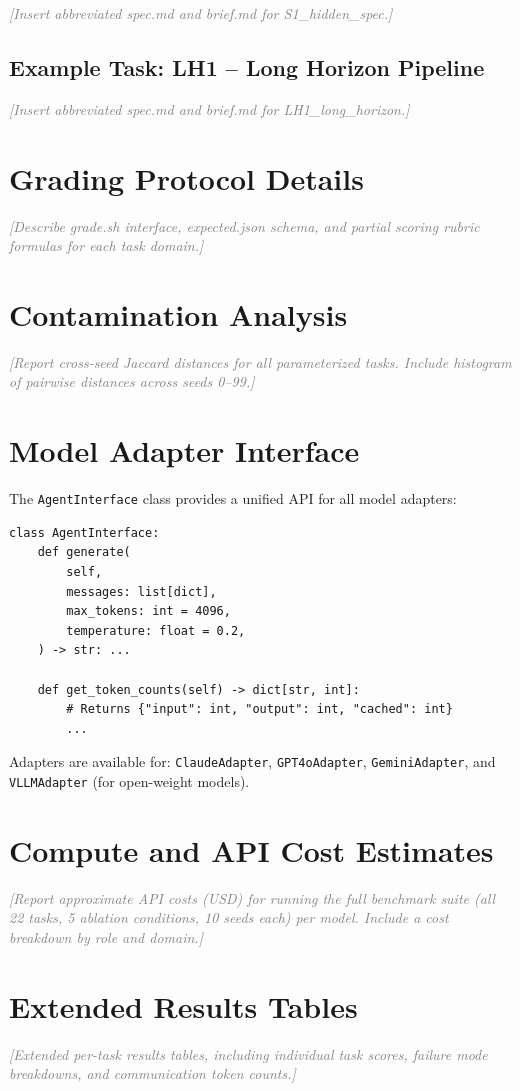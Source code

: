 \documentclass{article}
\newcommand{\placeholder}[1]{\textcolor{gray}{\textit{[#1]}}}
\newcommand{\sys}[1]{\texttt{#1}}
\begin{document}
\placeholder{Insert abbreviated spec.md and brief.md for S1\_hidden\_spec.}

\subsection{Example Task: LH1 -- Long Horizon Pipeline}
\label{app:tasks:lh1}

\placeholder{Insert abbreviated spec.md and brief.md for LH1\_long\_horizon.}

\section{Grading Protocol Details}
\label{app:grading}

\placeholder{Describe grade.sh interface, expected.json schema, and
partial scoring rubric formulas for each task domain.}

\section{Contamination Analysis}
\label{app:contamination}

\placeholder{Report cross-seed Jaccard distances for all parameterized tasks.
Include histogram of pairwise distances across seeds 0--99.}

\section{Model Adapter Interface}
\label{app:adapters}

The \sys{AgentInterface} class provides a unified API for all model adapters:

\begin{verbatim}
class AgentInterface:
    def generate(
        self,
        messages: list[dict],
        max_tokens: int = 4096,
        temperature: float = 0.2,
    ) -> str: ...

    def get_token_counts(self) -> dict[str, int]:
        # Returns {"input": int, "output": int, "cached": int}
        ...
\end{verbatim}

Adapters are available for: \sys{ClaudeAdapter}, \sys{GPT4oAdapter},
\sys{GeminiAdapter}, and \sys{VLLMAdapter} (for open-weight models).

\section{Compute and API Cost Estimates}
\label{app:cost}

\placeholder{Report approximate API costs (USD) for running the full
benchmark suite (all 22 tasks, 5 ablation conditions, 10 seeds each) per
model. Include a cost breakdown by role and domain.}

\section{Extended Results Tables}
\label{app:results}

\placeholder{Extended per-task results tables, including individual task
scores, failure mode breakdowns, and communication token counts.}
\end{document}
